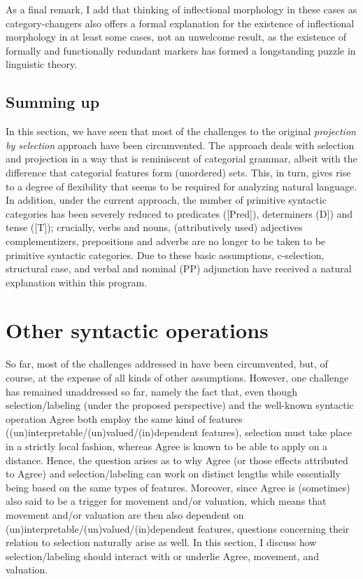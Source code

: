 \documentclass[output=paper
,modfonts
,nonflat]{langsci/langscibook}
\begin{document}
As a final remark, I add that thinking of inflectional morphology in these cases as category-changers also offers a formal explanation for the existence of inflectional morphology in at least some cases, not an unwelcome result, as the existence of formally and functionally redundant markers has formed a longstanding puzzle in linguistic theory.

\subsection{Summing up}
In this section, we have seen that most of the challenges to the original \textit{projection by selection} approach have been circumvented. The approach deals with selection and projection in a way that is reminiscent of categorial grammar, albeit with the difference that categorial features form (unordered) sets. This, in turn, gives rise to a degree of flexibility that seems to be required for analyzing natural language. In addition, under the current approach, the number of primitive syntactic categories has been severely reduced to predicates ([Pred]), determiners (D]) and tense ([T]); crucially, verbs and nouns, (attributively used) adjectives complementizers, prepositions and adverbs are no longer to be taken to be primitive syntactic categories. Due to these basic assumptions, c-selection, structural case, and verbal and nominal (PP) adjunction have received a natural explanation within this program.

\section{Other syntactic operations}
So far, most of the challenges addressed in  have been circumvented, but, of course, at the expense of all kinds of other assumptions. However, one challenge has remained unaddressed so far, namely the fact that, even though selection\slash labeling (under the proposed perspective) and the well-known syntactic operation Agree both employ the same kind of features ((un)interpretable\slash (un)valued\slash (in)dependent features), selection must take place in a strictly local fashion, whereas Agree is known to be able to apply on a distance. Hence, the question arises as to why Agree (or those effects attributed to Agree) and selection\slash labeling can work on distinct lengths while essentially being based on the same types of features. Moreover, since Agree is (sometimes) also said to be a trigger for movement and/or valuation, which means that movement and/or valuation are then also dependent on (un)interpretable\slash\relax(un)valued\slash\relax(in)dependent features, questions concerning their relation to selection naturally arise as well. In this section, I discuss how selection\slash labeling should interact with or underlie Agree, movement, and valuation.
\end{document}

